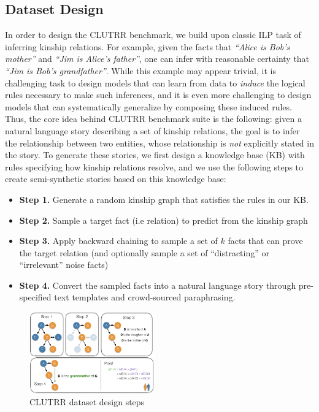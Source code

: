 \documentclass[12pt]{article}
\begin{document}
\subsection{Dataset Design}

In order to design the CLUTRR benchmark, we build upon classic ILP task of inferring kinship relations. For example, given the facts that \textit{``Alice is Bob's mother''} and \textit{``Jim is Alice's father''}, one can infer with reasonable certainty that \textit{``Jim is Bob's grandfather''}. While this example may appear trivial, it is challenging task to design models that can learn from data to \textit{induce} the logical rules necessary to make such inferences, and it is even more challenging to design models that can systematically generalize by composing these induced rules. Thus, the core idea behind CLUTRR benchmark suite is the following: given a natural language story describing a set of kinship relations, the goal is to infer the relationship between two entities, whose relationship is \textit{not} explicitly stated in the story. To generate these stories, we first design a knowledge base (KB) with rules specifying how kinship relations resolve, and we use the following steps to create semi-synthetic stories based on this knowledge base:

\begin{itemize}
        \item \textbf{Step 1.} Generate a random kinship graph that satisfies the rules in our KB.
        \item \textbf{Step 2.} Sample a target fact (i.e relation) to predict from the kinship graph
        \item \textbf{Step 3.} Apply backward chaining to sample a set of $k$ facts that can prove the target relation (and optionally sample a set of ``distracting'' or ``irrelevant'' noise facts)
        \item \textbf{Step 4.} Convert the sampled facts into a natural language story through pre-specified text templates and crowd-sourced paraphrasing.
\end{itemize}

\begin{figure}
\begin{center}
  \includegraphics[width=0.48\textwidth]{images/clutrr_dataset_proof.png}
\end{center}
\caption{CLUTRR dataset design steps}
\label{fig:clutrr_data_design}
\end{figure}
\end{document}

